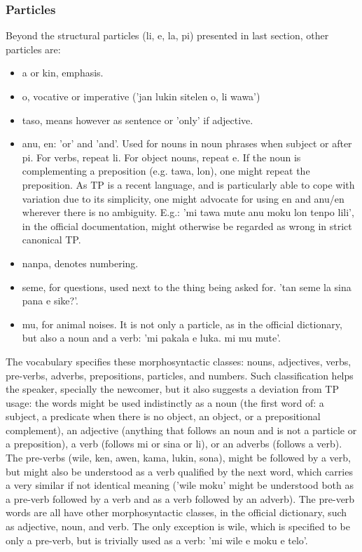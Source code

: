 \subsubsection{Particles}\label{sec:par}
Beyond the structural particles (li, e, la, pi) presented
in last section, other particles are:

\begin{itemize}
  \item a or kin, emphasis.
  \item o, vocative or imperative ('jan lukin sitelen o, li wawa')
  \item taso, means however as sentence or 'only' if adjective.
  \item anu, en: 'or' and 'and'. Used for nouns in noun phrases when subject or after pi.
    For verbs, repeat li.
    For object nouns, repeat e.
    If the noun is complementing a preposition (e.g. tawa, lon),
    one might repeat the preposition.
    As TP is a recent language, and is particularly able to cope with
    variation due to its simplicity, one might advocate for
    using en and anu/en wherever there is no ambiguity.
    E.g.: 'mi tawa mute anu moku lon tenpo lili',
    in the official documentation,
    might otherwise be regarded as wrong in strict canonical TP.
  \item nanpa, denotes numbering.
  \item seme, for questions, used next to the thing being asked for.
    'tan seme la sina pana e sike?'.
  \item mu, for animal noises. It is not only a particle, as in the
    official dictionary, but also a noun and a verb:
    'mi pakala e luka. mi mu mute'.
\end{itemize}

The vocabulary specifies these morphosyntactic classes:
nouns, adjectives, verbs, pre-verbs, adverbs, prepositions, particles, and numbers.
Such classification helps the speaker, specially the newcomer, but
it also suggests a deviation from TP usage:
the words might be used indistinctly as a noun
(the first word of: a subject, a predicate when there is no object, an object,
or a prepositional complement),
an adjective (anything that follows an noun and is not a particle or a
preposition),
a verb (follows mi or sina or li),
or an adverbs (follows a verb).
The pre-verbs (wile, ken, awen, kama, lukin, sona),
might be followed by a verb, but might also be understood
as a verb qualified by the next word,
which carries a very similar if not identical meaning
('wile moku' might be understood both as a pre-verb followed
by a verb and as a verb followed by an adverb).
The pre-verb words are all
have other morphosyntactic classes,
in the official dictionary,
such as adjective, noun, and verb.
The only exception is wile, which is specified to be only a pre-verb,
but is trivially used as a verb:
'mi wile e moku e telo'.

